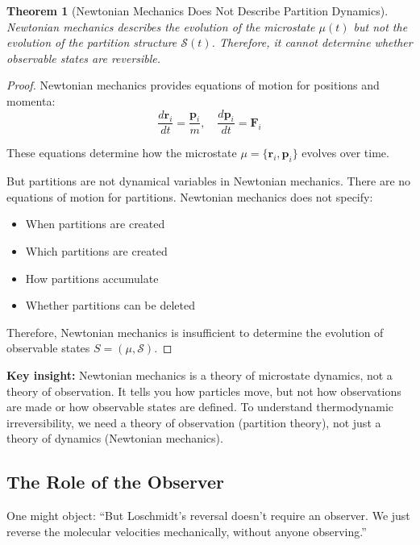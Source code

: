 \documentclass[twocolumn,10pt]{article}
\newtheorem{theorem}{Theorem}[section]
\theoremstyle{definition}
\theoremstyle{remark}
\begin{document}
\begin{theorem}[Newtonian Mechanics Does Not Describe Partition Dynamics]
\label{thm:newtonian_insufficient}
Newtonian mechanics describes the evolution of the microstate $\mu(t)$ but not the evolution of the partition structure $\mathcal{S}(t)$. Therefore, it cannot determine whether observable states are reversible.
\end{theorem}

\begin{proof}
Newtonian mechanics provides equations of motion for positions and momenta:
\begin{equation}
\frac{d\mathbf{r}_i}{dt} = \frac{\mathbf{p}_i}{m}, \quad \frac{d\mathbf{p}_i}{dt} = \mathbf{F}_i
\end{equation}

These equations determine how the microstate $\mu = \{\mathbf{r}_i, \mathbf{p}_i\}$ evolves over time.

But partitions are not dynamical variables in Newtonian mechanics. There are no equations of motion for partitions. Newtonian mechanics does not specify:
\begin{itemize}
\item When partitions are created
\item Which partitions are created
\item How partitions accumulate
\item Whether partitions can be deleted
\end{itemize}

Therefore, Newtonian mechanics is insufficient to determine the evolution of observable states $S = (\mu, \mathcal{S})$.
\end{proof}

\noindent\textbf{Key insight:} Newtonian mechanics is a theory of microstate dynamics, not a theory of observation. It tells you how particles move, but not how observations are made or how observable states are defined. To understand thermodynamic irreversibility, we need a theory of observation (partition theory), not just a theory of dynamics (Newtonian mechanics).

\subsection{The Role of the Observer}

One might object: ``But Loschmidt's reversal doesn't require an observer. We just reverse the molecular velocities mechanically, without anyone observing.''
\end{document}
